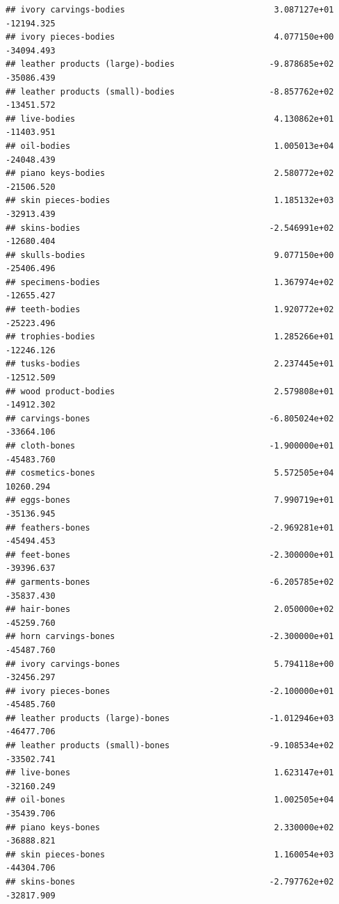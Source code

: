 \documentclass[
  12pt,
]{article}
\begin{document}
\begin{verbatim}
## ivory carvings-bodies                              3.087127e+01  -12194.325
## ivory pieces-bodies                                4.077150e+00  -34094.493
## leather products (large)-bodies                   -9.878685e+02  -35086.439
## leather products (small)-bodies                   -8.857762e+02  -13451.572
## live-bodies                                        4.130862e+01  -11403.951
## oil-bodies                                         1.005013e+04  -24048.439
## piano keys-bodies                                  2.580772e+02  -21506.520
## skin pieces-bodies                                 1.185132e+03  -32913.439
## skins-bodies                                      -2.546991e+02  -12680.404
## skulls-bodies                                      9.077150e+00  -25406.496
## specimens-bodies                                   1.367974e+02  -12655.427
## teeth-bodies                                       1.920772e+02  -25223.496
## trophies-bodies                                    1.285266e+01  -12246.126
## tusks-bodies                                       2.237445e+01  -12512.509
## wood product-bodies                                2.579808e+01  -14912.302
## carvings-bones                                    -6.805024e+02  -33664.106
## cloth-bones                                       -1.900000e+01  -45483.760
## cosmetics-bones                                    5.572505e+04   10260.294
## eggs-bones                                         7.990719e+01  -35136.945
## feathers-bones                                    -2.969281e+01  -45494.453
## feet-bones                                        -2.300000e+01  -39396.637
## garments-bones                                    -6.205785e+02  -35837.430
## hair-bones                                         2.050000e+02  -45259.760
## horn carvings-bones                               -2.300000e+01  -45487.760
## ivory carvings-bones                               5.794118e+00  -32456.297
## ivory pieces-bones                                -2.100000e+01  -45485.760
## leather products (large)-bones                    -1.012946e+03  -46477.706
## leather products (small)-bones                    -9.108534e+02  -33502.741
## live-bones                                         1.623147e+01  -32160.249
## oil-bones                                          1.002505e+04  -35439.706
## piano keys-bones                                   2.330000e+02  -36888.821
## skin pieces-bones                                  1.160054e+03  -44304.706
## skins-bones                                       -2.797762e+02  -32817.909

\end{verbatim}
\end{document}
